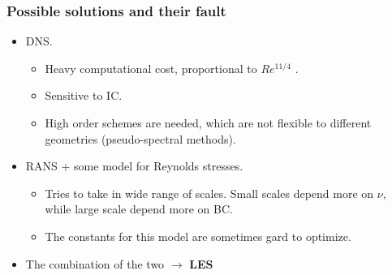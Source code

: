 \documentclass{beamer}
\begin{document}
\begin{frame}
  \frametitle{Possible solutions and their fault}
  \begin{itemize}
    \item DNS. 
      \begin{itemize}
        \item Heavy computational cost, proportional to $Re^{11/4}$ \cite{zouLARGEEDDYSIMULATION2006}.
        \item Sensitive to IC.
        \item High order schemes are needed, which are not flexible 
        to different geometries (pseudo-spectral methods).
      \end{itemize}
    \item RANS + some model for Reynolds stresses. 
      \begin{itemize}
        \item Tries to take in wide range of scales. Small scales depend 
        more on $\nu$, while large scale depend more on BC.
        \item The constants for this model are sometimes gard to optimize.  
      \end{itemize}
    \item The combination of the two $\rightarrow$ \textbf{LES}
  \end{itemize}
\end{frame}
\end{document}
